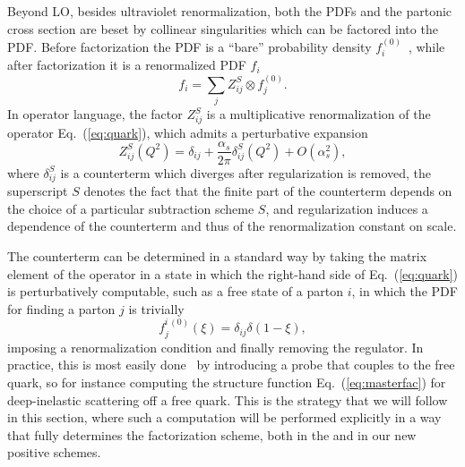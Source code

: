 Beyond LO, besides ultraviolet renormalization, both the
PDFs and the partonic cross section are beset by collinear
singularities which can be factored into the PDF. Before
factorization the PDF is a ``bare'' probability density $f_i^{(0)}$~\cite{Collins:2011zzd}, while after
factorization it is a
renormalized PDF  $f_i$
\begin{equation}
  \label{eq:pdffac}
f_i =\sum_{j} Z^S_{ij}\otimes f_j^{(0)}. %
\end{equation}
In operator language, the  factor $Z^S_{ij}$ is a multiplicative
renormalization of the operator Eq.~(\ref{eq:quark}), which admits a
perturbative expansion
\begin{equation}\label{eq:pertz}
Z^S_{ij}(Q^2)=\delta_{ij}+\frac{\alpha_s}{2\pi}
\delta^S_{ij}(Q^2)+O(\alpha_s^2),
\end{equation}
where $\delta^S_{ij}$ is a counterterm which diverges after
regularization is removed, the superscript $S$ denotes the fact
that the finite part of the counterterm depends on the choice of a
particular subtraction scheme $S$, and regularization induces a
dependence of the counterterm and thus of the renormalization constant
on scale.

The counterterm can be determined
in a standard way by taking the matrix element of the
operator in a state in which the right-hand side of
Eq.~(\ref{eq:quark}) is perturbatively computable, such as a free
state of a parton $i$, in which the PDF for finding a parton $j$ is
trivially
\begin{equation} \label{eq:freef}
  f_j^{i\,(0)}(\xi)=\delta_{ij}\delta(1-\xi),
\end{equation}
imposing a
renormalization condition and finally removing the regulator. In practice, this
is most easily done~\cite{Collins:2011zzd,Curci:1980uw} by introducing
a probe that couples to the free 
quark, so for instance computing the structure function
Eq.~(\ref{eq:masterfac}) for deep-inelastic scattering off a free
quark. This is the strategy that we will follow in this section, where
such a computation will be performed explicitly in a way that fully
determines the factorization scheme, both in the \msbar{} and in our
new positive schemes.


